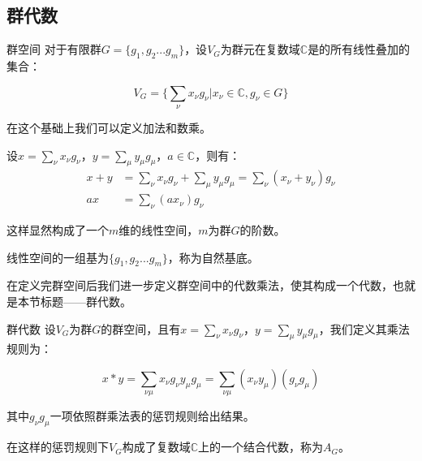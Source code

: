 \begin{issues}
\issueDraft
\end{issues}


\subsection{群代数}
\begin{definition}{群空间}
对于有限群$G=\{g_1,g_2...g_m\}$，设$V_G$为群元在复数域$\mathbb{C}$是的所有线性叠加的集合：

\begin{equation}
V_G=\{\displaystyle\sum_\nu x_\nu g_\nu|x_\nu \in \mathbb{C},g_\nu \in G\}
\end{equation}

在这个基础上我们可以定义加法和数乘。

设$x=\displaystyle\sum_\nu x_\nu g_\nu$，$y=\displaystyle\sum_\mu y_\mu g_\mu$，$a\in \mathbb{C}$，则有：
\begin{align}
x+y&=\displaystyle\sum_\nu x_\nu g_\nu+\displaystyle\sum_\mu y_\mu g_\mu=\displaystyle\sum_\nu(x_\nu+y_\nu)g_\nu\\
ax&=\displaystyle\sum_\nu (ax_\nu) g_\nu
\end{align}

这样显然构成了一个$m$维的线性空间，$m$为群$G$的阶数。

线性空间的一组基为$\{g_1,g_2...g_m\}$，称为自然基底。

\end{definition}

在定义完群空间后我们进一步定义群空间中的代数乘法，使其构成一个代数，也就是本节标题——群代数。

\begin{definition}{群代数}
设$V_G$为群$G$的群空间，且有$x=\displaystyle\sum_\nu x_\nu g_\nu$，$y=\displaystyle\sum_\mu y_\mu g_\mu$，我们定义其乘法规则为：

\begin{equation}
x*y=\displaystyle\sum_{\nu\mu}x_\nu g_\nu y_\mu g_\mu=
\displaystyle\sum_{\nu\mu}(x_\nu y_\mu) (g_\nu g_\mu)
\end{equation}

其中$g_\nu g_\mu$一项依照群乘法表的惩罚规则给出结果。

在这样的惩罚规则下$V_G$构成了复数域$\mathbb{C}$上的一个结合代数，称为$A_G$。

\end{definition}

